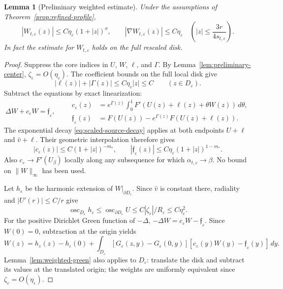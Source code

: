 \documentclass[11pt,reqno]{amsart}
\numberwithin{equation}{section}
\newtheorem{lemma}[theorem]{Lemma}
\theoremstyle{definition}
\theoremstyle{remark}
\newcommand{\eps}{\varepsilon}
\newcommand{\etae}{\eta_{\eps}}
\begin{document}
\begin{lemma}[Preliminary weighted estimate]
\label{lem:preliminary-pointwise}
Under the assumptions of Theorem~\ref{prop:refined-profile},
\begin{equation}\label{eq:preliminary-pointwise}
 |W_{t,\eps}(z)|\le C\etae(1+|z|)^\sigma,
 \qquad |\nabla W_{t,\eps}(z)|\le C\etae
 \quad\left(|z|\le\frac{3r}{4s_{t,\eps}}\right).
\end{equation}
In fact the estimate for $W_{t,\eps}$ holds on the full rescaled disk.
\end{lemma}

\begin{proof}
Suppress the core indices in $U$, $W$, $\ell$, and $\Gamma$.
By Lemma~\ref{lem:preliminary-center}, $\zeta_\eps=O(\etae)$.
The coefficient bounds on the full local disk give
\begin{equation}\label{eq:A-crude}
 |\ell(z)|+|\Gamma(z)|\le C\etae|z|\le C
 \qquad(z\in D_\eps).
\end{equation}
Subtract the equations by exact linearization:
\begin{equation}\label{eq:W-equation-exact}
 \Delta W+c_\eps W=\mathfrak f_\eps,
 \qquad
 \begin{aligned}
 c_\eps(z)&=e^{\Gamma(z)}\int_0^1
 F'(U(z)+\ell(z)+\theta W(z))\,d\theta,\\
 \mathfrak f_\eps(z)&=F(U(z))-e^{\Gamma(z)}F(U(z)+\ell(z)).
 \end{aligned}
\end{equation}
The exponential decay \eqref{eq:scaled-source-decay} applies at both
endpoints $U+\ell$ and $\widehat v+\ell$. Their geometric interpolation
therefore gives
\begin{equation}\label{eq:exact-linearization-bounds}
 |c_\eps(z)|\le C(1+|z|)^{-m_*},\qquad
 |\mathfrak f_\eps(z)|\le C\etae(1+|z|)^{1-m_*}.
\end{equation}
Also $c_\eps\to F'(U_\beta)$ locally along any subsequence for which
$\alpha_{t,\eps}\to\beta$. No bound on $\|W\|_\infty$ has been used.

Let $h_\eps$ be the harmonic extension of $W|_{\partial D_\eps}$.
Since $\widehat v$ is constant there, radiality and
$|U'(r)|\le C/r$ give
\begin{equation}\label{eq:harmonic-boundary-error}
 \operatorname{osc}_{D_\eps}h_\eps
 \le\operatorname{osc}_{\partial D_\eps}U
 \le C|\zeta_\eps|/R_\eps\le C\etae^2.
\end{equation}
For the positive Dirichlet Green function of $-\Delta$,
$-\Delta W=c_\eps W-\mathfrak f_\eps$. Since $W(0)=0$, subtraction at the
origin yields
\begin{equation}\label{eq:green-preliminary-contradiction}
 W(z)=h_\eps(z)-h_\eps(0)+\int_{D_\eps}
 [G_\eps(z,y)-G_\eps(0,y)]
 [c_\eps(y)W(y)-\mathfrak f_\eps(y)]\,dy.
\end{equation}
Lemma~\ref{lem:weighted-green} also applies to $D_\eps$: translate
the disk and subtract its values at the translated origin; the weights
are uniformly equivalent since $\zeta_\eps=O(\etae)$.


\end{proof}
\end{document}
